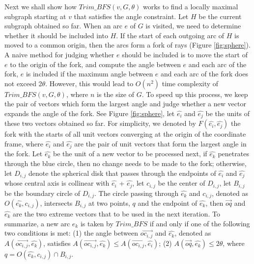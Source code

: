 Next we shall show how $Trim\_BFS(v, G, \theta)$ works to find a locally maximal subgraph starting at $v$ that satisfies the angle constraint. Let $H$ be the current subgraph obtained so far. When an arc $e$ of $G$ is visited, we need to determine whether it should be included into $H$. If the start of each outgoing arc of $H$ is moved to a common origin, then the arcs form a fork of rays (Figure \ref{fig:sphere}). A naive method for judging whether $e$ should be included is to move the start of $e$ to the origin of the fork, and compute the angle between $e$ and each arc of the fork, $e$ is included if the maximum angle between $e$ and each arc of the fork does not exceed 2$\theta$. However, this would lead to $O(n^{2})$ time complexity of $Trim\_BFS(v, G, \theta)$, where $n$ is the size of $G$. To speed up this process, we keep the pair of vectors which form the largest angle and judge whether a new vector expands the angle of the fork. See Figure \ref{fig:sphere}, let $\hat{e_i}$  and $\hat{e_j}$ be the units of these two vectors obtained so far. For simplicity, we denoted by $F( \hat{e_i}, \hat{e_j} )$ the fork with the starts of all unit vectors converging at the origin of the coordinate frame, where $\hat{e_i}$  and  $\hat{e_j}$  are the pair of unit vectors that form the largest angle in the fork. Let $\hat{e_k}$  be the unit of a new vector to be processed next, if $\hat{e_k}$ penetrates through the blue circle, then no change needs to be made to the fork; otherwise, let $D_{i,j}$ denote the spherical disk that passes through the endpoints of $\hat{e_i}$  and $\hat{e_j}$ whose central axis is collinear with $\hat{e_i}$  + $\hat{e_j}$, let $c_{i,j}$ be the center of $D_{i,j}$, let $B_{i,j}$ be the boundary circle of $D_{i,j}$. The circle passing through $\hat{e_k}$  and $c_{i,j}$, denoted as $O( \hat{e_k}, c_{i,j})$, intersects  $B_{i,j}$ at two points, $q$ and the endpoint of $\hat{e_k}$, then $\overrightarrow{oq}$ and $\hat{e_k}$ are the two extreme vectors that to be used in the next iteration. To summarize, a new arc $e_k$ is taken by $Trim\_BFS$ if and only if one of the following two conditions is met:
(1) the angle between $\overrightarrow{oc_{i,j}}$ and $\hat{e_k}$, denoted as $A(\overrightarrow{oc_{i,j}}, \hat{e_k})$, satisfies  $A(\overrightarrow{oc_{i,j}}, \hat{e_k}) \leq A(\overrightarrow{oc_{i,j}}, \hat{e_i})$;
(2) $A(\overrightarrow{oq}, \hat{e_k})  \leq  2\theta$, where $q = O( \hat{e_k}, c_{i,j}) \cap B_{i,j}$.


